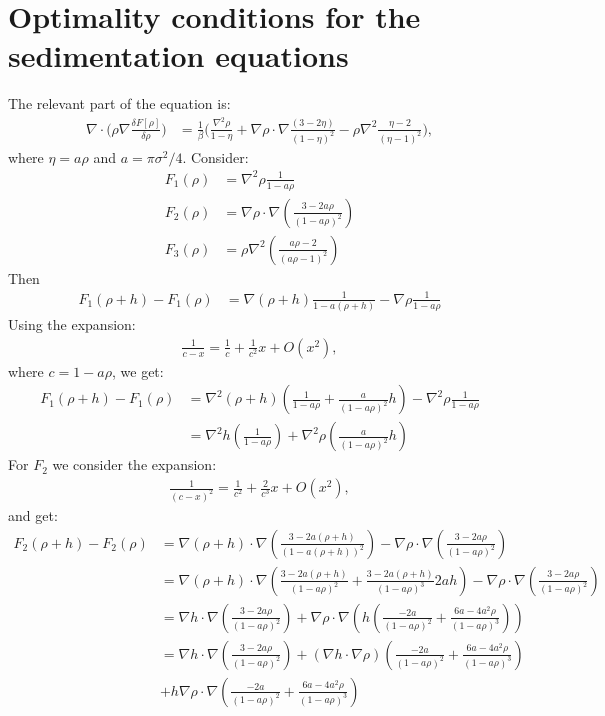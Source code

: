 \documentclass[11pt, a4paper]{article}
\theoremstyle{definition}
\begin{document}
	
\section{Optimality conditions for the sedimentation equations}
The relevant part of the equation is:
\begin{align*}
	\nabla \cdot \bigg(\rho \nabla \frac{\delta F[\rho]}{\delta \rho}\bigg)
	&= \frac{1}{\beta} \bigg( \frac{\nabla^2 \rho}{1 - \eta} +  \nabla \rho \cdot \nabla \frac{(3- 2 \eta)}{(1 - \eta)^2}  - \rho \nabla^2\frac{\eta - 2}{(\eta - 1)^2} \bigg),
\end{align*}
where $\eta = a \rho$ and $a = \pi \sigma^2 /4$.
Consider:
\begin{align*}
	F_1(\rho) &= \nabla^2 \rho \frac{1}{1- a\rho}\\
	F_2(\rho) &= \nabla \rho \cdot \nabla \left(\frac{3-2a\rho}{(1-a\rho)^2}\right)\\
	F_3(\rho) &= \rho \nabla^2 \left(\frac{a\rho -2}{(a\rho -1)^2}\right)
\end{align*}
Then
\begin{align*}
	F_1(\rho + h) - F_1(\rho) &= \nabla (\rho +h) \frac{1}{1- a(\rho +h)} - \nabla \rho \frac{1}{1- a\rho}
\end{align*}
Using the expansion: 
\begin{align*}
	\frac{1}{c - x} = \frac{1}{c} + \frac{1}{c^2}x + O(x^2),
\end{align*}
where $c = 1- a \rho$, we get:
\begin{align*}
	F_1(\rho + h) - F_1(\rho) &= \nabla^2 (\rho +h) \left(\frac{1}{1- a\rho} + \frac{a}{(1- a\rho)^2}h \right)- \nabla^2 \rho \frac{1}{1- a\rho}\\
	&= \nabla^2 h \left(\frac{1}{1- a\rho} \right) + \nabla^2 \rho \left(\frac{a}{(1- a\rho)^2}h\right)
\end{align*}
For $F_2$ we consider the expansion:
\begin{align*}
	\frac{1}{(c-x)^2} = \frac{1}{c^2} + \frac{2}{c^3}x + O(x^2),
\end{align*}
and get:
\begin{align*}
	F_2(\rho+h) - F_2(\rho) &= \nabla (\rho +h) \cdot \nabla \left(\frac{3-2a(\rho +h)}{(1-a(\rho+h))^2}\right) -\nabla \rho \cdot \nabla \left(\frac{3-2a\rho}{(1-a\rho)^2}\right) \\
	&= \nabla (\rho +h) \cdot \nabla \left(\frac{3-2a(\rho +h)}{(1-a\rho)^2} + \frac{3-2a(\rho +h)}{(1-a\rho)^3} 2ah \right) -\nabla \rho \cdot \nabla \left(\frac{3-2a\rho}{(1-a\rho)^2}\right)\\
	&=\nabla h \cdot \nabla \left(\frac{3-2a\rho}{(1-a\rho)^2} \right) + \nabla \rho \cdot \nabla \left(h\left(\frac{-2a }{(1-a\rho)^2} + \frac{6a-4a^2  \rho}{(1-a\rho)^3}  \right)\right)\\
	& = \nabla h \cdot \nabla \left( \frac{3-2a\rho}{(1-a\rho)^2} \right) + \left(\nabla h \cdot \nabla \rho \right) \left( \frac{-2a }{(1-a\rho)^2} + \frac{6a-4a^2  \rho}{(1-a\rho)^3}  \right) \\
	&+ h \nabla \rho \cdot \nabla \left(\frac{-2a }{(1-a\rho)^2} + \frac{6a-4a^2  \rho}{(1-a\rho)^3}  \right)
\end{align*}
\end{document}
